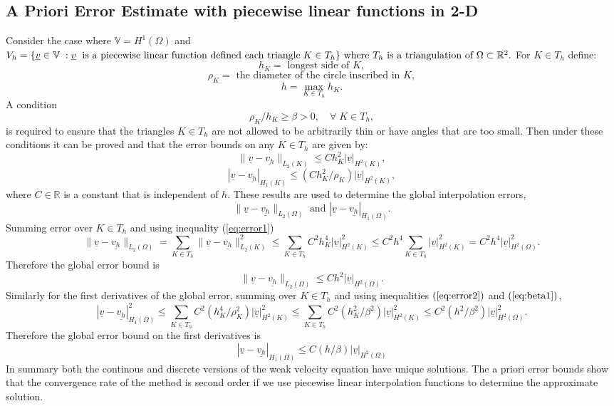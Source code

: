 \documentclass[11pt]{article}
\newcommand{\ul}{\underline}
\newcommand{\bigv}{\mathbb{V}}
\newcommand{\Om}{\Omega}
\begin{document}
\subsection{A Priori Error Estimate with piecewise linear functions in 2-D}
Consider the case where $\bigv = H^1(\Om)$ and \\$V_h = \{\ul{v}\in \bigv\;: \ul{v}\;\text{ is a piecewise linear function defined each triangle}\; K \in T_h\} \text{ where } \\T_h \text{ is a triangulation of } \Om\subset\mathbb{R}^2.$
For $K\in{T_h}$ define:
$$h_K = \text{ longest side of } K,$$
$$\rho_K = \text{ the diameter of the circle inscribed in } K,$$
$$h = \max_{K\in{T_h}}h_K.$$
A condition 
\begin{equation}
\label{eq:beta1}
\rho_K/h_K\geq\beta>0,\quad \forall\;K\in{T_h},
\end{equation}
is required to ensure that the triangles $K\in{T_h}$ are not allowed to be arbitrarily thin or have angles that are too small.
Then under these conditions it can be proved \cite{Johnson2012} and \cite{Dupont1980} that the error bounds on any $K\in{T_h}$ are given by:
\begin{equation}
\label{eq:error1}
\|\ul{v}-\ul{v_h}\|_{L_2(K)} \leq Ch_K^2|\ul{v}|_{H^2(K)},
\end{equation}
\begin{equation}
\label{eq:error2}
|\ul{v}-\ul{v_h}|_{H_1(K)} \leq (Ch_K^2/\rho_K)|\ul{v}|_{H^2(K)},
\end{equation}
where $C \in \mathbb{R}$ is a constant that is independent of $h$.
These results are used to determine the global interpolation errors, $$\|\ul{v}-\ul{v_h}\|_{L_2(\Om)} \text{ and } |\ul{v}-\ul{v_h}|_{H_1(\Om)}.$$
Summing error over $K\in{T_h}$ and using inequality (\ref{eq:error1})
$$\|\ul{v}-\ul{v_h}\|_{L_2(\Om)}= \sum_{K\in{T_h}}\|\ul{v}-\ul{v_h}\|_{L_2(K)}^2 \leq \sum_{K\in{T_h}}C^2h_K^4|\ul{v}|_{H^2(K)}^2
\leq{C}^2h^4\sum_{K\in{T_h}}|\ul{v}|_{H^2(K)}^2 = C^2h^4|\ul{v}|_{H^2(\Om)}^2.$$
Therefore the global error bound is
\begin{equation}
\label{eq:error3}
\|\ul{v}-\ul{v_h}\|_{L_2(\Om)} \leq Ch^2|\ul{v}|_{H^2(\Om)}.
\end{equation}
Similarly for the first derivatives of the global error, summing over $K\in{T_h}$ and using inequalities $(\ref{eq:error2})$ and $(\ref{eq:beta1})$,
$$|\ul{v}-\ul{v_h}|_{H_1(\Om)}^2 \leq \sum_{K\in{T_h}}C^2(h_K^4/\rho_K^2)|\ul{v}|_{H^2(K)}^2 \leq \sum_{K\in{T_h}}C^2(h_K^2/\beta^2)|\ul{v}|_{H^2(K)}^2 \leq C^2(h^2/\beta^2)|\ul{v}|_{H^2(\Om)}^2.$$
Therefore the global error bound on the first derivatives is
\begin{equation}
\label{eq:error4}
|\ul{v}-\ul{v_h}|_{H_1(\Om)} \leq C(h/\beta)|\ul{v}|_{H^2(\Om)}
\end{equation}
In summary both the continous and discrete versions of the weak velocity equation have unique solutions. The a priori error bounds show that the convergence rate of the method is second order if we use piecewise linear interpolation functions to determine the approximate solution. 
\end{document}
